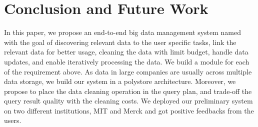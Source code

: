 \section{Conclusion and Future Work}
\label{sec:conclusion}

In this paper, we propose an end-to-end big data management system named \dcv with the goal of discovering relevant data to the user specific tasks, link the relevant data for better usage, cleaning the data with limit budget, handle data updates, and enable iteratively processing the data. We build a module for each of the requirement above. As data in large companies are usually across multiple data storage, we build our system in a polystore architecture. Moreover, we propose to place the data cleaning operation in the query plan, and trade-off the query result quality with the cleaning costs. We deployed our preliminary system on two different institutions, MIT and Merck and got positive feedbacks from the users.


